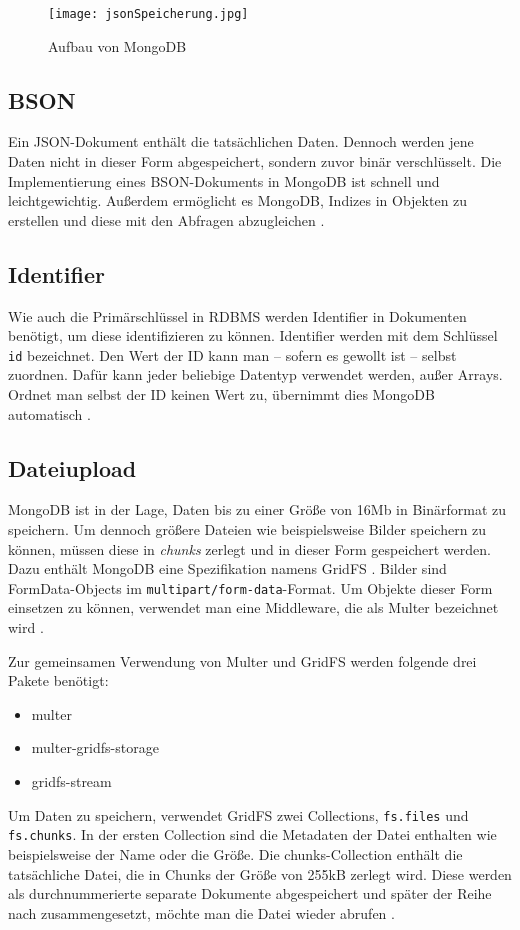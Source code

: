 \begin{figure}
    \centering
    \texttt{[image: jsonSpeicherung.jpg]}
    \label{img:jsonSpeicherung}
    \caption{Aufbau von MongoDB \cite[S.30]{zwei}}
\end{figure}

\subsection{BSON}
Ein JSON-Dokument enthält die tatsächlichen Daten. Dennoch werden jene Daten nicht in dieser Form abgespeichert, sondern zuvor binär verschlüsselt. Die Implementierung eines BSON-Dokuments in MongoDB ist schnell und leichtgewichtig. Außerdem ermöglicht es MongoDB, Indizes in Objekten zu erstellen und diese mit den Abfragen abzugleichen \cite[S.31]{zwei}. 


\subsection{Identifier}

Wie auch die Primärschlüssel in RDBMS werden Identifier in Dokumenten benötigt, um diese identifizieren zu können. Identifier werden mit dem Schlüssel \texttt{id} bezeichnet. Den Wert der ID kann man – sofern es gewollt ist – selbst zuordnen. Dafür kann jeder beliebige Datentyp verwendet werden, außer Arrays. Ordnet man selbst der ID keinen Wert zu, übernimmt dies MongoDB automatisch \cite[S.32]{zwei}.


\subsection{Dateiupload}
MongoDB ist in der Lage, Daten bis zu einer Größe von 16Mb in Binärformat zu speichern. Um dennoch größere Dateien wie beispielsweise Bilder speichern zu können, müssen diese in \textit{chunks} zerlegt und in dieser Form gespeichert werden. Dazu enthält MongoDB eine Spezifikation namens GridFS \cite{gridfs}.  Bilder sind FormData-Objects im \texttt{multipart/form-data}-Format. Um Objekte dieser Form einsetzen zu können, verwendet man eine Middleware, die als Multer bezeichnet wird \cite{multer}. 

Zur gemeinsamen Verwendung von Multer und GridFS werden folgende drei Pakete benötigt:
\begin{itemize}
    \item multer
    \item multer-gridfs-storage
    \item gridfs-stream
\end{itemize}

Um Daten zu speichern, verwendet GridFS zwei Collections, \texttt{fs.files} und \texttt{fs.chunks}. In der ersten Collection sind die Metadaten der Datei enthalten wie beispielsweise der Name oder die Größe. Die chunks-Collection enthält die tatsächliche Datei, die in Chunks der Größe von 255kB zerlegt wird. Diese werden als durchnummerierte separate Dokumente abgespeichert und später der Reihe nach zusammengesetzt, möchte man die Datei wieder abrufen \cite{ganguli}. 

